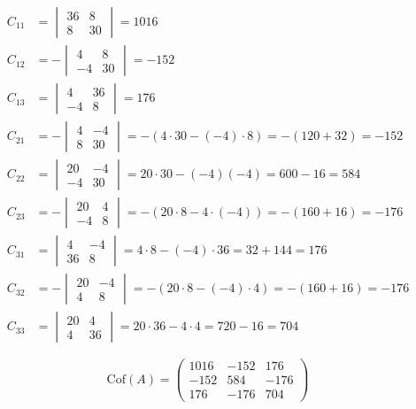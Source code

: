 \documentclass[10pt,a4paper]{article}
\begin{document}
\begin{enumerate}
{\begin{enumerate}
\begin{align*}
C_{11} &= \begin{vmatrix} 36 & 8 \\ 8 & 30 \end{vmatrix} = 1016 \\[4pt]
C_{12} &= -\begin{vmatrix} 4 & 8 \\ -4 & 30 \end{vmatrix} = -152 \\[4pt]
C_{13} &= \begin{vmatrix} 4 & 36 \\ -4 & 8 \end{vmatrix} = 176 \\[4pt]
C_{21} &= -\begin{vmatrix} 4 & -4 \\ 8 & 30 \end{vmatrix} = -(4 \cdot 30 - (-4) \cdot 8) = -(120 + 32) = -152 \\[4pt]
C_{22} &= \begin{vmatrix} 20 & -4 \\ -4 & 30 \end{vmatrix} = 20 \cdot 30 - (-4)(-4) = 600 - 16 = 584 \\[4pt]
C_{23} &= -\begin{vmatrix} 20 & 4 \\ -4 & 8 \end{vmatrix} = -(20 \cdot 8 - 4 \cdot (-4)) = -(160 + 16) = -176 \\[4pt]
C_{31} &= \begin{vmatrix} 4 & -4 \\ 36 & 8 \end{vmatrix} = 4 \cdot 8 - (-4) \cdot 36 = 32 + 144 = 176 \\[4pt]
C_{32} &= -\begin{vmatrix} 20 & -4 \\ 4 & 8 \end{vmatrix} = -(20 \cdot 8 - (-4) \cdot 4) = -(160 + 16) = -176 \\[4pt]
C_{33} &= \begin{vmatrix} 20 & 4 \\ 4 & 36 \end{vmatrix} = 20 \cdot 36 - 4 \cdot 4 = 720 - 16 = 704
\end{align*}

$$\text{Cof}(A) =
\begin{pmatrix}
1016 & -152 & 176 \\
-152 & 584 & -176 \\
176 & -176 & 704
\end{pmatrix}$$


\end{enumerate}}
\end{enumerate}
\end{document}
